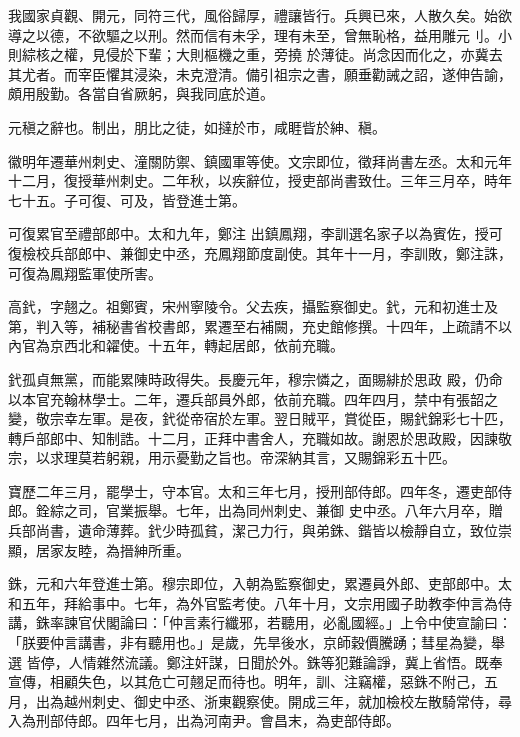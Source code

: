 \begin{pinyinscope}
 我國家貞觀、開元，同符三代，風俗歸厚，禮讓皆行。兵興已來，人散久矣。始欲導之以德，不欲驅之以刑。然而信有未孚，理有未至，曾無恥格，益用雕元刂。小則綜核之權，見侵於下輩；大則樞機之重，旁撓
 於薄徒。尚念因而化之，亦冀去其尤者。而宰臣懼其浸染，未克澄清。備引祖宗之書，願垂勸誡之詔，遂伸告諭，頗用殷勤。各當自省厥躬，與我同底於道。



 元稹之辭也。制出，朋比之徒，如撻於市，咸睚眥於紳、稹。



 徽明年遷華州刺史、潼關防禦、鎮國軍等使。文宗即位，徵拜尚書左丞。太和元年十二月，復授華州刺史。二年秋，以疾辭位，授吏部尚書致仕。三年三月卒，時年七十五。子可復、可及，皆登進士第。



 可復累官至禮部郎中。太和九年，鄭注
 出鎮鳳翔，李訓選名家子以為賓佐，授可復檢校兵部郎中、兼御史中丞，充鳳翔節度副使。其年十一月，李訓敗，鄭注誅，可復為鳳翔監軍使所害。



 高釴，字翹之。祖鄭賓，宋州寧陵令。父去疾，攝監察御史。釴，元和初進士及第，判入等，補秘書省校書郎，累遷至右補闕，充史館修撰。十四年，上疏請不以內官為京西北和糴使。十五年，轉起居郎，依前充職。



 釴孤貞無黨，而能累陳時政得失。長慶元年，穆宗憐之，面賜緋於思政
 殿，仍命以本官充翰林學士。二年，遷兵部員外郎，依前充職。四年四月，禁中有張韶之變，敬宗幸左軍。是夜，釴從帝宿於左軍。翌日賊平，賞從臣，賜釴錦彩七十匹，轉戶部郎中、知制誥。十二月，正拜中書舍人，充職如故。謝恩於思政殿，因諫敬宗，以求理莫若躬親，用示憂勤之旨也。帝深納其言，又賜錦彩五十匹。



 寶歷二年三月，罷學士，守本官。太和三年七月，授刑部侍郎。四年冬，遷吏部侍郎。銓綜之司，官業振舉。七年，出為同州刺史、兼御
 史中丞。八年六月卒，贈兵部尚書，遺命薄葬。釴少時孤貧，潔己力行，與弟銖、鍇皆以檢靜自立，致位崇顯，居家友睦，為搢紳所重。



 銖，元和六年登進士第。穆宗即位，入朝為監察御史，累遷員外郎、吏部郎中。太和五年，拜給事中。七年，為外官監考使。八年十月，文宗用國子助教李仲言為侍講，銖率諫官伏閣論曰：「仲言素行纖邪，若聽用，必亂國經。」上令中使宣諭曰：「朕要仲言講書，非有聽用也。」是歲，先旱後水，京師穀價騰踴；彗星為變，舉選
 皆停，人情雜然流議。鄭注奸謀，日聞於外。銖等犯難論諍，冀上省悟。既奉宣傳，相顧失色，以其危亡可翹足而待也。明年，訓、注竊權，惡銖不附己，五月，出為越州刺史、御史中丞、浙東觀察使。開成三年，就加檢校左散騎常侍，尋入為刑部侍郎。四年七月，出為河南尹。會昌末，為吏部侍郎。




\end{pinyinscope}
